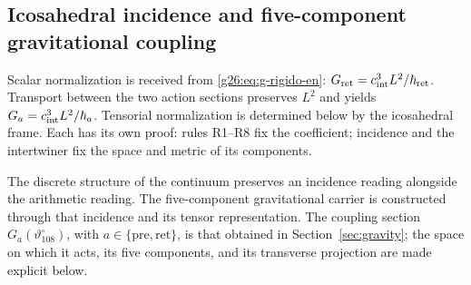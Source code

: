 \subsection{Icosahedral incidence and five-component gravitational coupling}
\label{sec:ii-pentadica}

Scalar normalization is received from
\eqref{g26:eq:g-rigido-en}: \(G_{\rm ret}=c_{\rm int}^3L^2/\hbar_{\rm ret}\).
Transport between the two action sections preserves \(L^2\) and
yields \(G_a=c_{\rm int}^3L^2/\hbar_a\). Tensorial normalization
is determined below by the icosahedral frame. Each has its own proof:
rules R1--R8 fix the coefficient; incidence and the intertwiner fix
the space and metric of its components.

The discrete structure of the continuum preserves an incidence reading
alongside the arithmetic reading. The five-component gravitational carrier is
constructed through that incidence and its tensor representation. The coupling
section \(G_a(\vartheta^\circ_{108})\), with
\(a\in\{\mathrm{pre},\mathrm{ret}\}\), is that obtained in
Section~\ref{sec:gravity}; the space on which it acts,
its five components, and its transverse projection are made explicit below.

